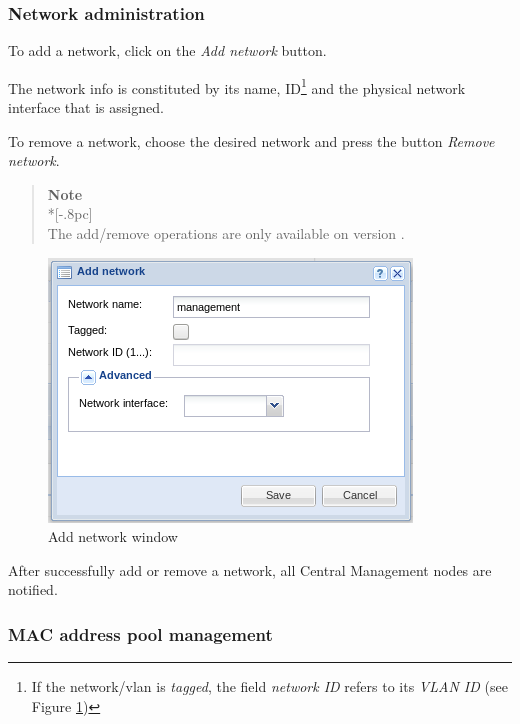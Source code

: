 \subsubsection{Network administration}

To add a network, click on the \emph{Add network} button.

The network info is constituted by its name, ID\footnote{If the network/vlan is \emph{tagged}, the field \emph{network ID} refers to its \emph{VLAN ID} (see Figure \ref{fig:network_create})} and the physical network interface that is assigned.

To remove a network, choose the desired network and press the button \emph{Remove network}. 

\begin{quote}
	{\large \bf Note} \\*[-.8pc]
	\underline{\hspace{6in}} \\
    The add/remove operations are only available on version \acronym.
\end{quote}


\begin{figure}[H]
	\begin{center}
	\includegraphics[scale=0.5]{screenshots/network_create.png}
	\caption{Add network window}
	\label{fig:network_create}
	\end{center}
\end{figure}

After successfully add or remove a network, all Central Management nodes are notified.

\subsubsection{MAC address pool management}
\label{sec:mac_pool}


